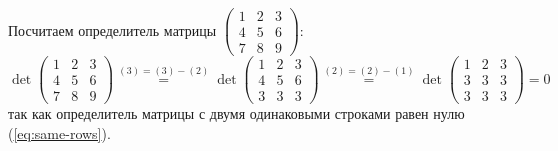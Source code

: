 \documentclass[a4paper,12pt]{article}
\begin{document}
  Посчитаем определитель матрицы
  $\left(\begin{smallmatrix}1 & 2 & 3\\ 4 & 5 & 6\\ 7 & 8 & 9\end{smallmatrix}\right)$:
  \[
    \det \begin{pmatrix}
      1 & 2 & 3\\
      4 & 5 & 6\\
      7 & 8 & 9
    \end{pmatrix}
    \stackrel{(3) = (3) - (2)}{=} \det \begin{pmatrix}
      1 & 2 & 3\\
      4 & 5 & 6\\
      3 & 3 & 3
    \end{pmatrix}
    \stackrel{(2) = (2) - (1)}{=} \det \begin{pmatrix}
      1 & 2 & 3\\
      3 & 3 & 3\\
      3 & 3 & 3
    \end{pmatrix}
    = 0
  \]
  так как определитель матрицы с двумя одинаковыми строками равен нулю (\ref{eq:same-rows}).
  
\end{document}
